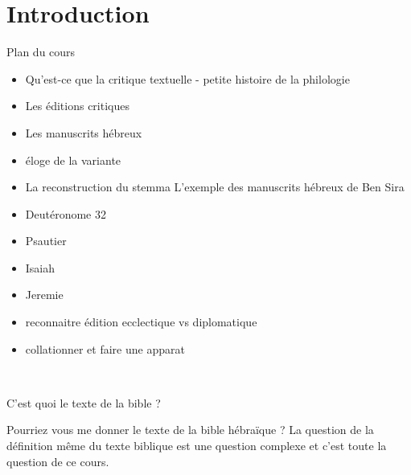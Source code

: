 \documentclass[11pt]{beamer}
\begin{document}
\begin{frame}
	\titlepage
\end{frame}
\section*{Introduction}
\begin{frame}{Plan du cours}
\begin{itemize}
    \item Qu'est-ce que la critique textuelle - petite histoire de la philologie
    \item Les éditions critiques
    \item Les manuscrits hébreux
    

    \item éloge de la variante
    
    \item La reconstruction du stemma
        L'exemple des manuscrits hébreux de Ben Sira
    \item Deutéronome 32
    \item Psautier
    \item Isaiah
    \item Jeremie
    \item reconnaitre édition ecclectique vs diplomatique
    \item collationner et faire une apparat
    
    \
\end{itemize}
\end{frame}

\begin{frame}{C'est quoi le texte de la bible ?}

\begin{alertblock}{Pourriez vous me donner le texte de la bible hébraïque ?}
\pause
    La question de la définition même du texte biblique est une question  complexe et c'est toute la question de ce cours.
\end{alertblock}

\end{frame}
\end{document}
